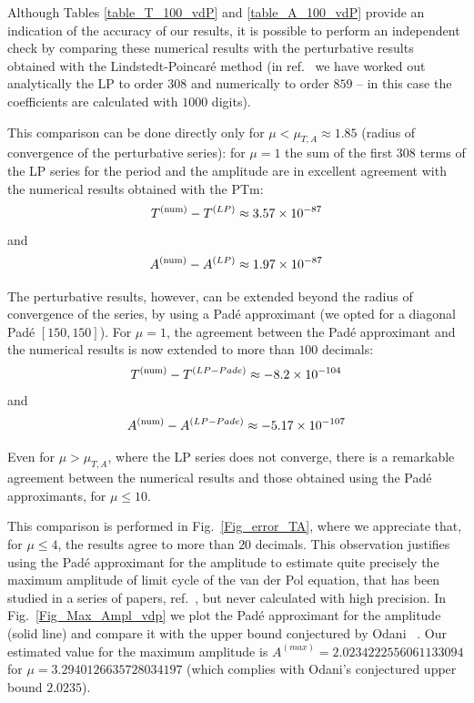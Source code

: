 \documentclass[final]{article}
\begin{document}
Although Tables \ref{table_T_100_vdP} and \ref{table_A_100_vdP} provide an indication of the accuracy of our results, it is possible to perform an independent check by comparing these numerical results with the perturbative results obtained with the Lindstedt-Poincar\'e method (in ref.~\cite{Amore18} we have worked out analytically the LP to order $308$ and numerically to order $859$ -- in this case the coefficients are calculated with $1000$ digits). 

This comparison can be done directly only for $\mu < \mu_{T,A} \approx 1.85$ (radius of convergence of the perturbative series):
for $\mu=1$ the sum of the first $308$ terms of the LP series for the period and the amplitude are in excellent agreement 
with the numerical results obtained with the PTm:
\begin{equation}
T^{({\rm num})} - T^{(LP)} \approx  3.57 \times 10^{-87}
\end{equation}
and
\begin{equation}
A^{({\rm num})} - A^{(LP)} \approx  1.97 \times 10^{-87}
\end{equation}

The perturbative results, however, can be extended beyond the radius of convergence of the series, by using a Pad\'e approximant 
(we opted for a diagonal Pad\'e $[150,150]$). 
For $\mu= 1$, the agreement between the Pad\'e approximant and the numerical results is now extended to more than $100$ decimals:
\begin{equation}
T^{({\rm num})} - T^{(LP-Pade)} \approx  -8.2 \times 10^{-104} 
\end{equation}
and
\begin{equation}
A^{({\rm num})} - A^{(LP-Pade)} \approx  -5.17 \times 10^{-107} 
\end{equation}

Even for $\mu > \mu_{T,A}$, where the LP series does not converge, there is a remarkable agreement between 
the numerical results and those obtained using the Pad\'e approximants, for $\mu \leq 10$. 

This comparison is performed in Fig.~\ref{Fig_error_TA}, where we appreciate that, for $\mu \leq 4$, the results agree to more than $20$ decimals. This observation justifies using the Pad\'e approximant for the amplitude to estimate quite precisely the maximum amplitude of limit cycle of the van der Pol equation, that has been studied in a series of papers, ref.~\cite{Odani00, Lijun15, Turner15, Cao17, Ignatev17}, but never calculated with high precision. In Fig.~\ref{Fig_Max_Ampl_vdp} we plot the Pad\'e approximant for the amplitude (solid line) and compare it with the upper bound conjectured by Odani ~\cite{Odani00}. 
Our estimated value for the maximum amplitude is $A^{(max)}=2.0234222556061133094$ for $\mu = 3.2940126635728034197$ (which complies with Odani's conjectured upper bound $2.0235$).
\end{document}
